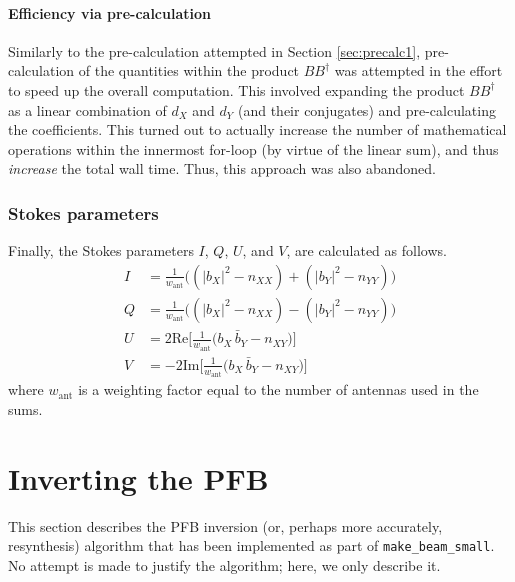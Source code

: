 \documentclass{article}
\begin{document}
\paragraph{Efficiency via pre-calculation}
Similarly to the pre-calculation attempted in Section \ref{sec:precalc1}, pre-calculation of the quantities within the product $BB^\dagger$ was attempted in the effort to speed up the overall computation.
This involved expanding the product $BB^\dagger$ as a linear combination of $d_X$ and $d_Y$ (and their conjugates) and pre-calculating the coefficients.
This turned out to actually increase the number of mathematical operations within the innermost for-loop (by virtue of the linear sum), and thus \emph{increase} the total wall time.
Thus, this approach was also abandoned.

\subsubsection{Stokes parameters}

Finally, the Stokes parameters $I$, $Q$, $U$, and $V$, are calculated as follows.
\begin{align}
    I &= \frac{1}{w_\text{ant}}\bigg((|b_X|^2 - n_{XX}) + (|b_Y|^2 - n_{YY})\bigg) \\
    Q &= \frac{1}{w_\text{ant}}\bigg((|b_X|^2 - n_{XX}) - (|b_Y|^2 - n_{YY})\bigg) \\
    U &=  2 \text{Re}\bigg[\frac{1}{w_\text{ant}}\bigg(b_X\,\bar{b}_Y - n_{XY}\bigg)\bigg]\\
    V &= -2 \text{Im}\bigg[\frac{1}{w_\text{ant}}\bigg(b_X\,\bar{b}_Y - n_{XY}\bigg)\bigg]
\end{align}
where $w_\text{ant}$ is a weighting factor equal to the number of antennas used in the sums.

\newpage
\section{Inverting the PFB}

This section describes the PFB inversion (or, perhaps more accurately, resynthesis) algorithm that has been implemented as part of \texttt{make\_beam\_small}.
No attempt is made to justify the algorithm; here, we only describe it.
\end{document}
